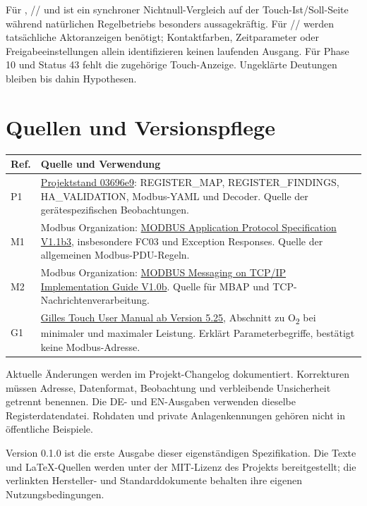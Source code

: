 \documentclass[10pt,a4paper]{article}
\begin{document}
Für , // und  ist ein synchroner Nichtnull-Vergleich auf der Touch-Ist/Soll-Seite während natürlichen Regelbetriebs besonders aussagekräftig. Für // werden tatsächliche Aktoranzeigen benötigt; Kontaktfarben, Zeitparameter oder Freigabeeinstellungen allein identifizieren keinen laufenden Ausgang. Für Phase 10 und Status 43 fehlt die zugehörige Touch-Anzeige. Ungeklärte Deutungen bleiben bis dahin Hypothesen.

\section{Quellen und Versionspflege}
\label{sec:sources}
\par\noindent\begin{tabularx}{\linewidth}{@{}L{13mm}X@{}}
\toprule\textbf{Ref.}&\textbf{Quelle und Verwendung}\\\midrule
P1 & \href{https://github.com/mschabhuettl/gilles-hpk-ra-modbus/tree/03696e929aa14fee1007d7c630489978c27533fc}{Projektstand 03696e9}: REGISTER\_MAP, REGISTER\_FINDINGS, HA\_VALIDATION, Modbus-YAML und Decoder. Quelle der gerätespezifischen Beobachtungen.\\
M1 & Modbus Organization: \href{https://www.modbus.org/file/secure/modbusprotocolspecification.pdf}{MODBUS Application Protocol Specification V1.1b3}, insbesondere FC03 und Exception Responses. Quelle der allgemeinen Modbus-PDU-Regeln.\\
M2 & Modbus Organization: \href{https://www.modbus.org/file/secure/messagingimplementationguide.pdf}{MODBUS Messaging on TCP/IP Implementation Guide V1.0b}. Quelle für MBAP und TCP-Nachrichtenverarbeitung.\\
G1 & \href{https://shop.baxi.se/documents/Gilles\%20Touch\%20-\%20manual\%20v5.25\%20(ENG).pdf}{Gilles Touch User Manual ab Version 5.25}, Abschnitt zu O\textsubscript{2} bei minimaler und maximaler Leistung. Erklärt Parameterbegriffe, bestätigt keine Modbus-Adresse.\\\bottomrule
\end{tabularx}\par

Aktuelle Änderungen werden im Projekt-Changelog dokumentiert. Korrekturen müssen Adresse, Datenformat, Beobachtung und verbleibende Unsicherheit getrennt benennen. Die DE- und EN-Ausgaben verwenden dieselbe Registerdatendatei. Rohdaten und private Anlagenkennungen gehören nicht in öffentliche Beispiele.

Version 0.1.0 ist die erste Ausgabe dieser eigenständigen Spezifikation. Die Texte und LaTeX-Quellen werden unter der MIT-Lizenz des Projekts bereitgestellt; die verlinkten Hersteller- und Standarddokumente behalten ihre eigenen Nutzungsbedingungen.
\end{document}
